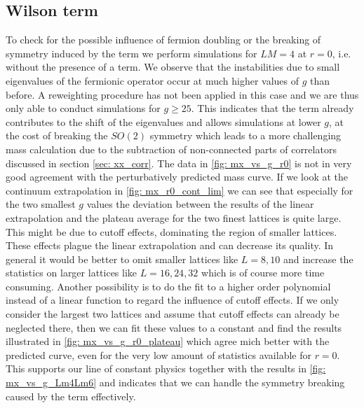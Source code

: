 \subsection*{Wilson term}
To check for the possible influence of fermion doubling or the breaking of symmetry induced by the  term we perform simulations for $LM=4$ at $r=0$, i.e. without the presence of a  term. We observe that the instabilities due to small eigenvalues of the fermionic operator occur at much higher values of $g$ than before. A reweighting procedure has not been applied in this case and we are thus only able to conduct simulations for $g \geq 25$. This indicates that the  term already contributes to the shift of the eigenvalues and allows simulations at lower $g$, at the cost of breaking the $SO(2)$ symmetry which leads to a more challenging mass calculation due to the subtraction of non-connected parts of correlators discussed in section \ref{sec: xx_corr}. The data in \autoref{fig: mx_vs_g_r0} is not in very good agreement with the perturbatively predicted mass curve. If we look at the continuum extrapolation in \autoref{fig: mx_r0_cont_lim} we can see that especially for the two smallest $g$ values the deviation between the results of the linear extrapolation and the plateau average for the two finest lattices is quite large. This might be due to cutoff effects, dominating the region of smaller lattices. These effects plague the linear extrapolation and can decrease its quality. In general it would be better to omit smaller lattices like $L=8,10$ and increase the statistics on larger lattices like $L=16,24,32$ which is of course more time consuming. Another possibility is to do the fit to a higher order polynomial instead of a linear function to regard the influence of cutoff effects. If we only consider the largest two lattices and assume that cutoff effects can already be neglected there, then we can fit these values to a constant and find the results illustrated in \autoref{fig: mx_vs_g_r0_plateau} which agree mich better with the predicted curve, even for the very low amount of statistics available for $r=0$. This supports our line of constant physics together with the results in \autoref{fig: mx_vs_g_Lm4Lm6} and indicates that we can handle the symmetry breaking caused by the  term effectively.
%
%
